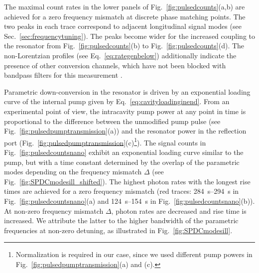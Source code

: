 \documentclass[aps,pra,showpacs,reprint,onecolumn,notitlepage]{revtex4-1}
\begin{document}
The maximal count rates in the lower panels of Fig.~\ref{fig:pulsedcounts}(a,b) are achieved for a zero frequency mismatch at discrete phase matching points. The two peaks in each trace correspond to adjacent longitudinal signal modes (see Sec.~\ref{sec:frequencytuning}). The peaks become wider for the increased coupling to the resonator from Fig.~\ref{fig:pulsedcounts}(b) to Fig.~\ref{fig:pulsedcounts}(d). The non-Lorentzian profiles (see Eq.~\ref{eq:rategenbelow}) additionally indicate the presence of other conversion channels, which have not been blocked with bandpass filters for this measurement \cite{Michael2014}.

Parametric down-conversion in the resonator is driven by an exponential loading curve of the internal pump given by Eq.~\ref{eq:cavityloadinginend}. From an experimental point of view, the intracavity pump power at any point in time is proportional to the difference between the unmodified pump pulse (see Fig.~\ref{fig:pulsedpumptransmission}(a)) and the resonator power in the reflection port (Fig.~\ref{fig:pulsedpumptransmission}(c)\footnote{Normalization is required in our case, since we used different pump powers in Fig.~\ref{fig:pulsedpumptransmission}(a) and (c).}). The signal counts in Fig.~\ref{fig:pulsedcountsnano} exhibit an exponential loading curve similar to the pump, but with a time constant determined by the overlap of the parametric modes depending on the frequency mismatch $\Delta$ (see Fig.~\ref{fig:SPDCmodesill_shifted}). The highest photon rates with the longest rise times are achieved for a zero frequency mismatch (red traces: \SIrange[range-units = single]{284}{294}{\s} in Fig.~\ref{fig:pulsedcountsnano}(a) and \SIrange[range-units = single]{124}{154}{\s} in Fig.~\ref{fig:pulsedcountsnano}(b)). At non-zero frequency mismatch $\Delta$, photon rates are decreased and rise time is increased. We attribute the latter to the higher bandwidth of the parametric frequencies at non-zero detuning, as illustrated in Fig.~\ref{fig:SPDCmodesill}.
\end{document}
